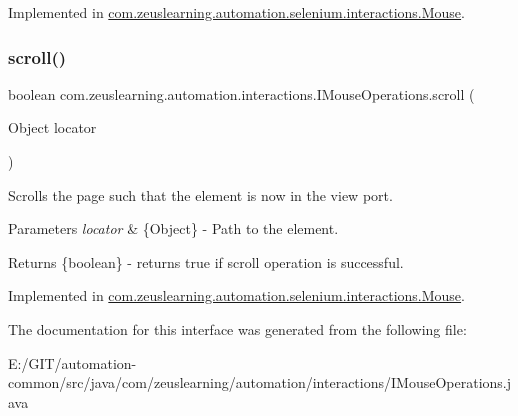 Implemented in \hyperlink{classcom_1_1zeuslearning_1_1automation_1_1selenium_1_1interactions_1_1Mouse_a6ff0b8676b191327548fc56b852c2a65}{com.\+zeuslearning.\+automation.\+selenium.\+interactions.\+Mouse}.

\hypertarget{interfacecom_1_1zeuslearning_1_1automation_1_1interactions_1_1IMouseOperations_af08b8fe7ad0752c04b8760247e944158}{}\label{interfacecom_1_1zeuslearning_1_1automation_1_1interactions_1_1IMouseOperations_af08b8fe7ad0752c04b8760247e944158} 
\subsubsection{\texorpdfstring{scroll()}{scroll()}\hspace{0.1cm}{\footnotesize\ttfamily [2/2]}}
{\footnotesize\ttfamily boolean com.\+zeuslearning.\+automation.\+interactions.\+I\+Mouse\+Operations.\+scroll (\begin{DoxyParamCaption}\item[{Object}]{locator }\end{DoxyParamCaption})}

Scrolls the page such that the element is now in the view port.


\begin{DoxyParams}{Parameters}
{\em locator} & \{Object\} -\/ Path to the element.\\
\hline
\end{DoxyParams}
\begin{DoxyReturn}{Returns}
\{boolean\} -\/ returns {\ttfamily true} if scroll operation is successful. 
\end{DoxyReturn}


Implemented in \hyperlink{classcom_1_1zeuslearning_1_1automation_1_1selenium_1_1interactions_1_1Mouse_a64c168b0d5f3a2df84426d3723960a97}{com.\+zeuslearning.\+automation.\+selenium.\+interactions.\+Mouse}.



The documentation for this interface was generated from the following file\+:\begin{DoxyCompactItemize}
\item 
E\+:/\+G\+I\+T/automation-\/common/src/java/com/zeuslearning/automation/interactions/I\+Mouse\+Operations.\+java\end{DoxyCompactItemize}
